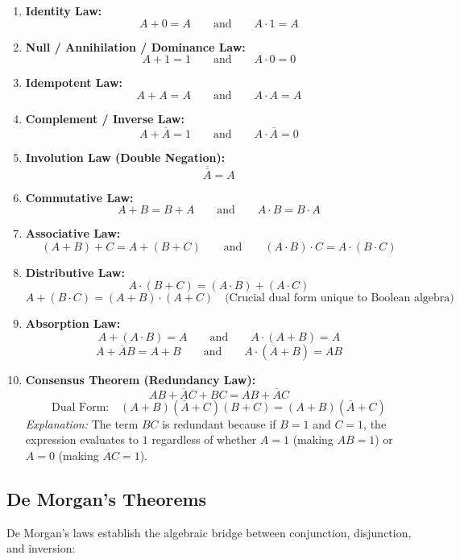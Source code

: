 \begin{enumerate}[label=\bfseries\arabic*.]
    \item \textbf{Identity Law:}
    \[ A + 0 = A \qquad \text{and} \qquad A \cdot 1 = A \]
    \item \textbf{Null / Annihilation / Dominance Law:}
    \[ A + 1 = 1 \qquad \text{and} \qquad A \cdot 0 = 0 \]
    \item \textbf{Idempotent Law:}
    \[ A + A = A \qquad \text{and} \qquad A \cdot A = A \]
    \item \textbf{Complement / Inverse Law:}
    \[ A + \overline{A} = 1 \qquad \text{and} \qquad A \cdot \overline{A} = 0 \]
    \item \textbf{Involution Law (Double Negation):}
    \[ \overline{\overline{A}} = A \]
    \item \textbf{Commutative Law:}
    \[ A + B = B + A \qquad \text{and} \qquad A \cdot B = B \cdot A \]
    \item \textbf{Associative Law:}
    \[ (A + B) + C = A + (B + C) \qquad \text{and} \qquad (A \cdot B) \cdot C = A \cdot (B \cdot C) \]
    \item \textbf{Distributive Law:}
    \[ A \cdot (B + C) = (A \cdot B) + (A \cdot C) \]
    \[ A + (B \cdot C) = (A + B) \cdot (A + C) \quad \text{(Crucial dual form unique to Boolean algebra)} \]
    \item \textbf{Absorption Law:}
    \[ A + (A \cdot B) = A \qquad \text{and} \qquad A \cdot (A + B) = A \]
    \[ A + \overline{A} B = A + B \qquad \text{and} \qquad A \cdot (\overline{A} + B) = A B \]
    \item \textbf{Consensus Theorem (Redundancy Law):}
    \begin{equation}
    \label{eq:consensus_theorem}
    AB + \overline{A}C + BC = AB + \overline{A}C
    \end{equation}
    \[ \text{Dual Form:} \quad (A + B)(\overline{A} + C)(B + C) = (A + B)(\overline{A} + C) \]
    \textit{Explanation:} The term $BC$ is redundant because if $B=1$ and $C=1$, the expression evaluates to $1$ regardless of whether $A=1$ (making $AB=1$) or $A=0$ (making $\overline{A}C=1$).
\end{enumerate}

\subsection{De Morgan's Theorems}
De Morgan's laws establish the algebraic bridge between conjunction, disjunction, and inversion:

